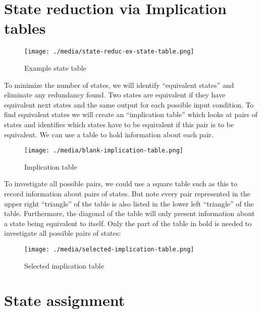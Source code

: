 \section{State reduction via Implication tables}

\begin{wrapfigure}[16]{r}[0pt]{0.4\linewidth}
\texttt{[image: ./media/state-reduc-ex-state-table.png]}
\caption{Example state table}
\end{wrapfigure}
To minimize the number of states, we will identify “equivalent
states” and eliminate any redundancy found. Two states are
equivalent if they have equivalent next states and the same output
for each possible input condition. To find equivalent states we will
create an “implication table” which looks at pairs of states and
identifies which states have to be equivalent if this pair is to be
equivalent. We can use a table to hold information about each pair.

\begin{wrapfigure}[10]{r}[0pt]{0.4\linewidth}
  \texttt{[image: ./media/blank-implication-table.png]}
  \caption{Implication table}
\end{wrapfigure}
To investigate all possible pairs, we could use a square table
such as this to record information about pairs of states. But
note every pair represented in the upper right “triangle” of the
table is also listed in the lower left “triangle” of the table.
Furthermore, the diagonal of the table will only present
information about a state being equivalent to itself. Only the
part of the table in bold is needed to investigate all possible
pairs of states:

\begin{wrapfigure}[5]{r}[0pt]{0.3\linewidth}
  \texttt{[image: ./media/selected-implication-table.png]}
  \caption{Selected implication table}
\end{wrapfigure}

\newpage
\section{State assignment}



